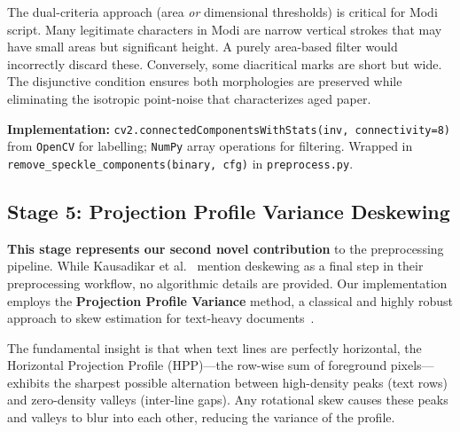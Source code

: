 \documentclass[12pt, a4paper]{article}
\begin{document}
The dual-criteria approach (area \emph{or} dimensional thresholds) is critical for Modi script. Many legitimate characters in Modi are narrow vertical strokes that may have small areas but significant height. A purely area-based filter would incorrectly discard these. Conversely, some diacritical marks are short but wide. The disjunctive condition ensures both morphologies are preserved while eliminating the isotropic point-noise that characterizes aged paper.

\textbf{Implementation:} \texttt{cv2.connectedComponentsWithStats(inv, connectivity=8)} from \texttt{OpenCV} for labelling; \texttt{NumPy} array operations for filtering. Wrapped in \texttt{remove\_speckle\_components(binary, cfg)} in \texttt{preprocess.py}.


\subsection{Stage 5: Projection Profile Variance Deskewing}
\label{sec:deskew}

\textbf{This stage represents our second novel contribution} to the preprocessing pipeline. While Kausadikar et al.~\cite{kausadikar2025} mention deskewing as a final step in their preprocessing workflow, no algorithmic details are provided. Our implementation employs the \textbf{Projection Profile Variance} method, a classical and highly robust approach to skew estimation for text-heavy documents~\cite{postl1986, baird1987}.

The fundamental insight is that when text lines are perfectly horizontal, the Horizontal Projection Profile (HPP)---the row-wise sum of foreground pixels---exhibits the sharpest possible alternation between high-density peaks (text rows) and zero-density valleys (inter-line gaps). Any rotational skew causes these peaks and valleys to blur into each other, reducing the variance of the profile.
\end{document}
